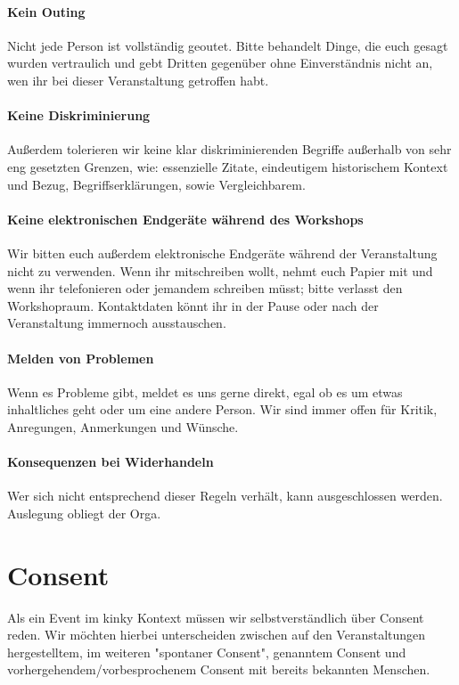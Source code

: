 \documentclass{article}
\begin{document}
\paragraph{\textcolor{PastelRed}{Kein Outing}}
Nicht jede Person ist vollständig geoutet. Bitte behandelt Dinge, die euch gesagt wurden vertraulich und gebt Dritten gegenüber ohne Einverständnis nicht an, wen ihr bei dieser Veranstaltung getroffen habt.
\paragraph{\textcolor{PastelRed}{Keine Diskriminierung}}
Außerdem tolerieren wir keine klar diskriminierenden Begriffe außerhalb von sehr eng gesetzten Grenzen, wie:  essenzielle Zitate, eindeutigem historischem Kontext und Bezug, Begriffserklärungen, sowie Vergleichbarem.
\paragraph{\textcolor{PastelRed}{Keine elektronischen Endgeräte während des Workshops}}
Wir bitten euch außerdem elektronische Endgeräte während der Veranstaltung nicht zu verwenden. Wenn ihr mitschreiben wollt, nehmt euch Papier mit und wenn ihr telefonieren oder jemandem schreiben müsst; bitte verlasst den Workshopraum. Kontaktdaten könnt ihr in der Pause oder nach der Veranstaltung immernoch ausstauschen.
\paragraph{\textcolor{PastelRed}{Melden von Problemen}}
Wenn es Probleme gibt, meldet es uns gerne direkt, egal ob es um etwas inhaltliches geht oder um eine andere Person. Wir sind immer offen für Kritik, Anregungen, Anmerkungen und Wünsche.
\paragraph{\textcolor{PastelRed}{Konsequenzen bei Widerhandeln}}
Wer sich nicht entsprechend dieser Regeln verhält, kann ausgeschlossen werden. Auslegung obliegt der Orga.

\section{Consent}
Als ein Event im kinky Kontext müssen wir selbstverständlich über Consent reden. Wir möchten hierbei unterscheiden zwischen auf den Veranstaltungen hergestelltem, im weiteren "spontaner Consent", genanntem Consent und vorhergehendem/vorbesprochenem Consent mit bereits bekannten Menschen.
\end{document}

